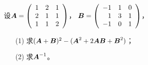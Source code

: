 \begin{frame}

\begin{li}[2006-2007第二学期]
设$\boldsymbol{A}=\left(
\begin{array}{rrr}
1&2&1\\
2&1&1\\
1&1&2
\end{array}
\right)$， $\boldsymbol{B}=\left(
\begin{array}{rrr}
-1&1&0\\
1&3&1\\
-1&0&1
\end{array}
\right)$，
\begin{itemize}
\item[(1)] 求$(\boldsymbol{A}+\boldsymbol{B})^2-(\boldsymbol{A}^2+2\boldsymbol{A}\boldsymbol{B}+\boldsymbol{B}^2)$；
\item[(2)]  求$\boldsymbol{A}^{-1}$。
\end{itemize}
\end{li}
\pause


\end{frame}
